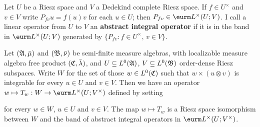    Let $U$ be a Riesz space and $V$ a
Dedekind complete Riesz space.   If $f\in U^{\times}$ and
$v\in V$ write $P_{fv}u=f(u)v$ for each $u\in U$;  then
$P_{fv}\in\eurm L^{\times}(U;V)$.   %
 I call a linear operator from $U$ to $V$ an {\bf abstract integral
operator} if it is in the band in $\eurm L^{\times}(U;V)$ generated by
$\{P_{fv}:f\in U^{\times},\,v\in V\}$.


 Let $(\frak
A,\bar\mu)$ and $(\frak B,\bar\nu)$ be semi-finite measure algebras,
with localizable measure algebra free product $(\frak C,\bar\lambda)$,
and $U\subseteq L^0(\frak A)$, $V\subseteq L^0(\frak B)$ order-dense
Riesz subspaces.   Write $W$ for the set of those $w\in L^0(\frak C)$
such that $w\times(u\otimes v)$ is integrable for every $u\in U$ and
$v\in V$.   Then we have an operator $w\mapsto T_w:W\to \eurm
L^{\times}(U;V^{\times})$ defined by setting


\noindent for every $w\in W$, $u\in U$ and $v\in V$.   The map
$w\mapsto T_w$ is a Riesz space isomorphism between $W$ and the band of
abstract integral operators in $\eurm L^{\times}(U;V^{\times})$.

